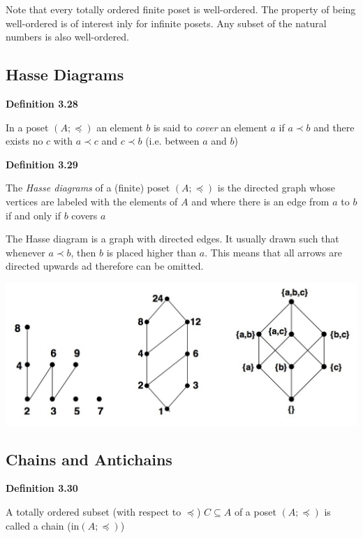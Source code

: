 \documentclass[a4paper]{report}
\newenvironment{definition}[1]{\begin{framed}\centerline{\textbf{Definition #1}}\noindent\hspace{-1.1mm}}{\end{framed}}
\begin{document}
Note that every totally ordered finite poset is well-ordered. The property of being well-ordered is of interest inly for infinite posets. Any subset of the natural numbers is also well-ordered. 

\subsection{Hasse Diagrams}
\begin{definition}{3.28}
In a poset $(A;\preceq)$ an element $b$ is said to \emph{cover} an element $a$ if $a\prec b$ and there exists no $c$ with $a\prec c$ and $c\prec b$ (i.e. between $a$ and $b$)
\end{definition}

\begin{definition}{3.29}
The \emph{Hasse diagrams} of a (finite) poset $(A;\preceq)$ is the directed graph whose vertices are labeled with the elements of $A$ and where there is an edge from $a$ to $b$ if and only if $b$ covers $a$
\end{definition}

The Hasse diagram is a graph with directed edges. It usually drawn such that whenever $a\prec b$, then $b$ is placed higher than $a$. This means that all arrows are directed upwards ad therefore can be omitted.

\begin{center}
\includegraphics[scale=0.27]{Figures/Figure3,1Page48.jpg}
\end{center}

\subsection{Chains and Antichains}
\begin{definition}{3.30}
A totally ordered subset (with respect to $\preceq$) $C\subseteq A$ of a poset $(A;\preceq)$ is called a chain (in$(A;\preceq)$)
\end{definition}
\end{document}
